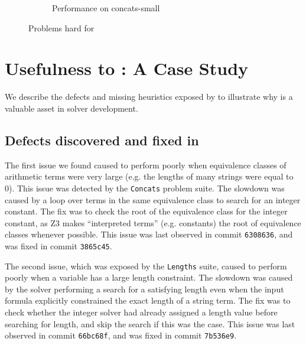 \begin{figure}[h]
\begin{subfigure}{.5\textwidth}
            \label{fig:concats-small}
            \vspace{-0.25in}
            \caption{Performance on concats-small}
        \end{subfigure}
        \vspace{-0.1in}
        \caption{Problems hard for \us{}}
        \label{fig:z3str3-hard}
        \vspace{-0.3in}
    \end{figure}

    
\section{Usefulness to \us{}: A Case Study}
\vspace{-0.1in}

        We describe the defects and missing heuristics exposed by \fuzzer{} to illustrate why \fuzzer{} is a valuable asset in solver development.

\vspace{-0.15in}
\subsection{Defects discovered and fixed in \us{}}
\vspace{-0.1in}

The first issue we found caused \us{} to perform poorly when equivalence classes 
of arithmetic terms were very large (e.g. the lengths of many strings were equal
to 0). This issue was detected by the \texttt{Concats} problem suite. The slowdown 
was caused by a loop over terms in the same equivalence class to search for an 
integer constant. The fix was to check the root of the equivalence class for the 
integer constant, as Z3 makes ``interpreted terms'' (e.g. constants) the root of 
equivalence classes whenever possible. This issue was last observed in commit 
\texttt{6308636}, and was fixed in commit \texttt{3865c45}.


The second issue, which was exposed by the \texttt{Lengths} suite, caused \us{} to 
perform poorly when a variable has a large length constraint.
The slowdown was caused by the solver performing a search for a satisfying length
even when the input formula explicitly constrained the exact length of a string term.
The fix was to check whether the integer solver had already assigned a length value
before searching for length, and skip the search if this was the case.
This issue was last observed in commit \texttt{66bc68f}, and was fixed in commit 
\texttt{7b536e9}.    
    
